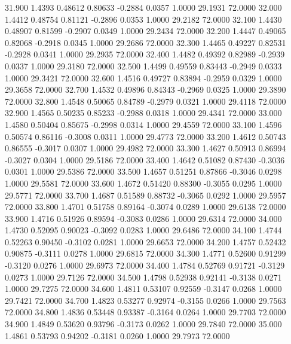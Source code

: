   31.900   1.4393   0.48612   0.80633  -0.2884   0.0357   1.0000  29.1931  72.0000
  32.000   1.4412   0.48754   0.81121  -0.2896   0.0353   1.0000  29.2182  72.0000
  32.100   1.4430   0.48907   0.81599  -0.2907   0.0349   1.0000  29.2434  72.0000
  32.200   1.4447   0.49065   0.82068  -0.2918   0.0345   1.0000  29.2686  72.0000
  32.300   1.4465   0.49227   0.82531  -0.2928   0.0341   1.0000  29.2935  72.0000
  32.400   1.4482   0.49392   0.82989  -0.2939   0.0337   1.0000  29.3180  72.0000
  32.500   1.4499   0.49559   0.83443  -0.2949   0.0333   1.0000  29.3421  72.0000
  32.600   1.4516   0.49727   0.83894  -0.2959   0.0329   1.0000  29.3658  72.0000
  32.700   1.4532   0.49896   0.84343  -0.2969   0.0325   1.0000  29.3890  72.0000
  32.800   1.4548   0.50065   0.84789  -0.2979   0.0321   1.0000  29.4118  72.0000
  32.900   1.4565   0.50235   0.85233  -0.2988   0.0318   1.0000  29.4341  72.0000
  33.000   1.4580   0.50404   0.85675  -0.2998   0.0314   1.0000  29.4559  72.0000
  33.100   1.4596   0.50574   0.86116  -0.3008   0.0311   1.0000  29.4773  72.0000
  33.200   1.4612   0.50743   0.86555  -0.3017   0.0307   1.0000  29.4982  72.0000
  33.300   1.4627   0.50913   0.86994  -0.3027   0.0304   1.0000  29.5186  72.0000
  33.400   1.4642   0.51082   0.87430  -0.3036   0.0301   1.0000  29.5386  72.0000
  33.500   1.4657   0.51251   0.87866  -0.3046   0.0298   1.0000  29.5581  72.0000
  33.600   1.4672   0.51420   0.88300  -0.3055   0.0295   1.0000  29.5771  72.0000
  33.700   1.4687   0.51589   0.88732  -0.3065   0.0292   1.0000  29.5957  72.0000
  33.800   1.4701   0.51758   0.89164  -0.3074   0.0289   1.0000  29.6138  72.0000
  33.900   1.4716   0.51926   0.89594  -0.3083   0.0286   1.0000  29.6314  72.0000
  34.000   1.4730   0.52095   0.90023  -0.3092   0.0283   1.0000  29.6486  72.0000
  34.100   1.4744   0.52263   0.90450  -0.3102   0.0281   1.0000  29.6653  72.0000
  34.200   1.4757   0.52432   0.90875  -0.3111   0.0278   1.0000  29.6815  72.0000
  34.300   1.4771   0.52600   0.91299  -0.3120   0.0276   1.0000  29.6973  72.0000
  34.400   1.4784   0.52769   0.91721  -0.3129   0.0273   1.0000  29.7126  72.0000
  34.500   1.4798   0.52938   0.92141  -0.3138   0.0271   1.0000  29.7275  72.0000
  34.600   1.4811   0.53107   0.92559  -0.3147   0.0268   1.0000  29.7421  72.0000
  34.700   1.4823   0.53277   0.92974  -0.3155   0.0266   1.0000  29.7563  72.0000
  34.800   1.4836   0.53448   0.93387  -0.3164   0.0264   1.0000  29.7703  72.0000
  34.900   1.4849   0.53620   0.93796  -0.3173   0.0262   1.0000  29.7840  72.0000
  35.000   1.4861   0.53793   0.94202  -0.3181   0.0260   1.0000  29.7973  72.0000
